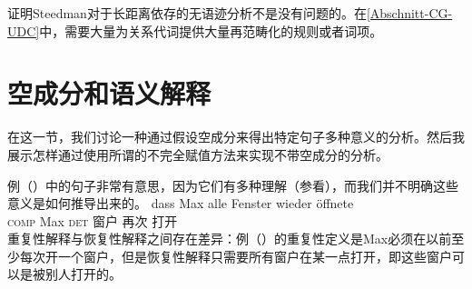  \citet{Pollard88a}证明Steedman对于长距离依存的无语迹分析不是没有问题的。在\ref{Abschnitt-CG-UDC}中，需要大量为关系代词提供大量再范畴化的规则或者词项。

\section{空成分和语义解释}
\label{Abschnitt-leere-Elemente-Semantik}
\label{sec-MRS-wieder}

在这一节，我们讨论一种通过假设空成分来得出特定句子多种意义的分析。然后我展示怎样通过使用所谓的不完全赋值方法来实现不带空成分的分析。

例（）中的句子非常有意思，因为它们有多种理解（参看\citealp[\S~5.6]{Dowty79a}），而我们并不明确这些意义是如何推导出来的。
\ea
\label{ex-alle-wieder}
\gll dass Max alle Fenster wieder öffnete\\
	 \textsc{comp} Max \textsc{det} 窗户 再次 打开\\
\z
重复性解释与恢复性解释之间存在差异：例（）的重复性定义是Max必须在以前至少每次开一个窗户，但是恢复性解释只需要所有窗户在某一点打开，即这些窗户可以是被别人打开的。

